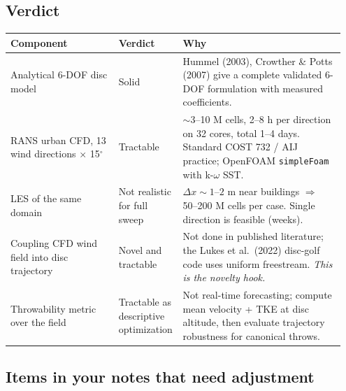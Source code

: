 \documentclass[11pt,letterpaper]{article}
\begin{document}
\subsection{Verdict}

\begin{center}
\footnotesize
\begin{tabular}{@{}p{0.32\linewidth}p{0.15\linewidth}p{0.48\linewidth}@{}}
\toprule
\textbf{Component} & \textbf{Verdict} & \textbf{Why} \\
\midrule
Analytical 6-DOF disc model & Solid & Hummel (2003), Crowther \& Potts (2007) give a complete validated 6-DOF formulation with measured coefficients. \\
RANS urban CFD, 13 wind directions $\times$ 15$^\circ$ & Tractable & $\sim$3--10 M cells, 2--8 h per direction on 32 cores, total 1--4 days. Standard COST 732 / AIJ practice; OpenFOAM \texttt{simpleFoam} with k-$\omega$ SST. \\
LES of the same domain & Not realistic for full sweep & $\Delta x \sim 1$--$2$ m near buildings $\Rightarrow$ 50--200 M cells per case. Single direction is feasible (weeks). \\
Coupling CFD wind field into disc trajectory & Novel and tractable & Not done in published literature; the Lukes et al.\ (2022) disc-golf code uses uniform freestream. \emph{This is the novelty hook.} \\
Throwability metric over the field & Tractable as descriptive optimization & Not real-time forecasting; compute mean velocity + TKE at disc altitude, then evaluate trajectory robustness for canonical throws. \\
\bottomrule
\end{tabular}
\end{center}

\subsection{Items in your notes that need adjustment}
\end{document}
